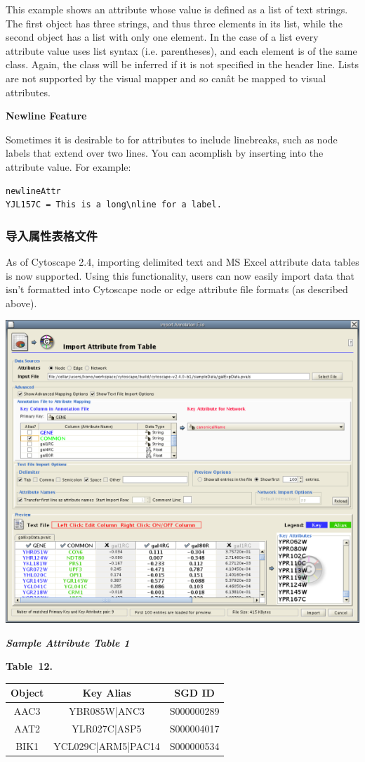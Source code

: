  This example shows an attribute whose value is defined as a list of text
strings. The first object has three strings, and thus three elements in its
list, while the second object has a list with only one element. In the case of
a list every attribute value uses list syntax (i.e. parentheses), and each
element is of the same class. Again, the class will be inferred if it is not
specified in the header line. Lists are not supported by the visual mapper and
so can\^at be mapped to visual attributes. 

\textbf{Newline Feature}

Sometimes it is desirable to for attributes to include linebreaks, such as node
labels that extend over two lines. You can acomplish by inserting   into the
attribute value. For example: 

 \begin{verbatim}
newlineAttr
YJL157C = This is a long\nline for a label.
\end{verbatim}

\subsubsection{导入属性表格文件}

 As of Cytoscape 2.4, importing delimited text and MS Excel attribute data
tables is now supported. Using this functionality, users can now easily import
data that isn't formatted into Cytoscape node or edge attribute file formats
(as described above). 

\centerline{\includegraphics[width=.6\textwidth]{images/attribute_table_import_main.png} }

 \emph{\textbf{Sample Attribute Table 1} }

 \textbf{Table 12. }

\begin{tabular}{|c|c|c|}
\hline 
 Object& Key Alias& SGD ID\\
\hline
 AAC3 &YBR085W|ANC3& S000000289\\
 AAT2 &YLR027C|ASP5& S000004017\\
 BIK1 & YCL029C|ARM5|PAC14 &S000000534\\
 \hline 
\end{tabular}

